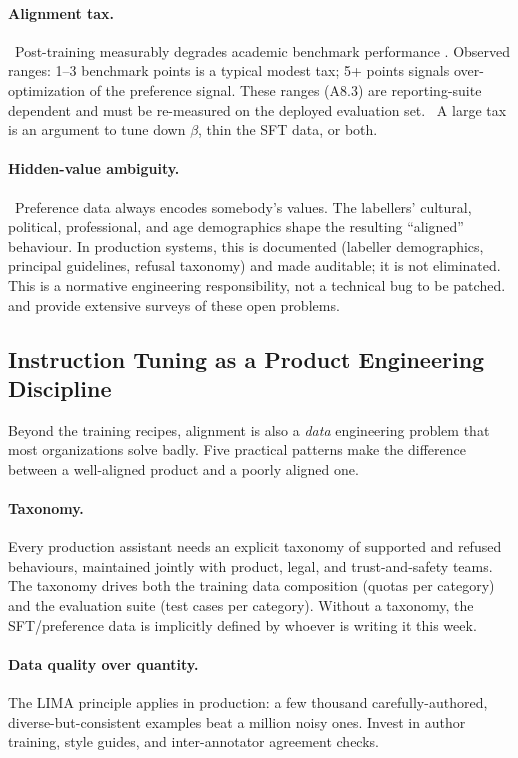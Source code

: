 \paragraph{Alignment tax.}
\Emp\ Post-training measurably degrades academic benchmark
performance \citep{ouyang2022training}. Observed ranges: 1--3
benchmark points is a typical modest tax; 5+ points signals
over-optimization of the preference signal. These ranges (A8.3)
are reporting-suite dependent and must be re-measured on the
deployed evaluation set. \Heur\ A large tax is an argument to tune
down $\beta$, thin the SFT data, or both.

\paragraph{Hidden-value ambiguity.}
\Norm\ Preference data always encodes somebody's values. The
labellers' cultural, political, professional, and age demographics
shape the resulting ``aligned'' behaviour. In production systems,
this is documented (labeller demographics, principal guidelines,
refusal taxonomy) and made auditable; it is not eliminated. This
is a normative engineering responsibility, not a technical bug to
be patched. \citet{anwar2024foundational} and
\citet{casper2023open} provide extensive surveys of these open
problems.

\subsection{Instruction Tuning as a Product Engineering Discipline}

Beyond the training recipes, alignment is also a \emph{data}
engineering problem that most organizations solve badly. Five
practical patterns make the difference between a well-aligned
product and a poorly aligned one.

\paragraph{Taxonomy.} Every production assistant needs an explicit
taxonomy of supported and refused behaviours, maintained jointly
with product, legal, and trust-and-safety teams. The taxonomy drives
both the training data composition (quotas per category) and the
evaluation suite (test cases per category). Without a taxonomy, the
SFT/preference data is implicitly defined by whoever is writing it
this week.

\paragraph{Data quality over quantity.}
The LIMA principle \citep{zhou2023lima} applies in production: a few
thousand carefully-authored, diverse-but-consistent examples beat a
million noisy ones. Invest in author training, style guides, and
inter-annotator agreement checks.

